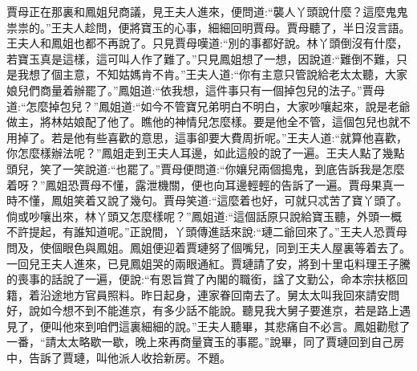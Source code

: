 \begin{parag}
    賈母正在那裏和鳳姐兒商議，見王夫人進來，便問道:“襲人丫頭說什麼？這麼鬼鬼祟祟的。”王夫人趁問，便將寶玉的心事，細細回明賈母。賈母聽了，半日沒言語。王夫人和鳳姐也都不再說了。只見賈母嘆道:“別的事都好說。林丫頭倒沒有什麼，若寶玉真是這樣，這可叫人作了難了。”只見鳳姐想了一想，因說道:“難倒不難，只是我想了個主意，不知姑媽肯不肯。”王夫人道:“你有主意只管說給老太太聽，大家娘兒們商量着辦罷了。”鳳姐道:“依我想，這件事只有一個掉包兒的法子。”賈母道:“怎麼掉包兒？”鳳姐道:“如今不管寶兄弟明白不明白，大家吵嚷起來，說是老爺做主，將林姑娘配了他了。瞧他的神情兒怎麼樣。要是他全不管，這個包兒也就不用掉了。若是他有些喜歡的意思，這事卻要大費周折呢。”王夫人道:“就算他喜歡，你怎麼樣辦法呢？”鳳姐走到王夫人耳邊，如此這般的說了一遍。王夫人點了幾點頭兒，笑了一笑說道:“也罷了。”賈母便問道:“你孃兒兩個搗鬼，到底告訴我是怎麼着呀？”鳳姐恐賈母不懂，露泄機關，便也向耳邊輕輕的告訴了一遍。賈母果真一時不懂，鳳姐笑着又說了幾句。賈母笑道:“這麼着也好，可就只忒苦了寶丫頭了。倘或吵嚷出來，林丫頭又怎麼樣呢？”鳳姐道:“這個話原只說給寶玉聽，外頭一概不許提起，有誰知道呢。”正說間，丫頭傳進話來說:“璉二爺回來了。”王夫人恐賈母問及，使個眼色與鳳姐。鳳姐便迎着賈璉努了個嘴兒，同到王夫人屋裏等着去了。一回兒王夫人進來，已見鳳姐哭的兩眼通紅。賈璉請了安，將到十里屯料理王子騰的喪事的話說了一遍，便說:“有恩旨賞了內閣的職銜，諡了文勤公，命本宗扶柩回籍，着沿途地方官員照料。昨日起身，連家眷回南去了。舅太太叫我回來請安問好，說如今想不到不能進京，有多少話不能說。聽見我大舅子要進京，若是路上遇見了，便叫他來到咱們這裏細細的說。”王夫人聽畢，其悲痛自不必言。鳳姐勸慰了一番，“請太太略歇一歇，晚上來再商量寶玉的事罷。”說畢，同了賈璉回到自己房中，告訴了賈璉，叫他派人收拾新房。不題。
\end{parag}


